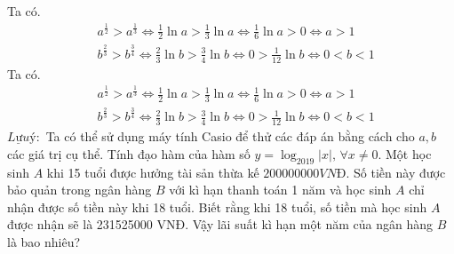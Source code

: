 \documentclass{article}
\begin{document}
Ta có.
$$
\begin{aligned}
& a^{\frac{1}{2}}>a^{\frac{1}{3}} \Leftrightarrow \frac{1}{2} \ln a>\frac{1}{3} \ln a \Leftrightarrow \frac{1}{6} \ln a>0 \Leftrightarrow a>1 \\
& b^{\frac{2}{3}}>b^{\frac{3}{4}} \Leftrightarrow \frac{2}{3} \ln b>\frac{3}{4} \ln b \Leftrightarrow 0>\frac{1}{12} \ln b \Leftrightarrow 0<b<1
\end{aligned}
$$
Ta có.
$$
\begin{aligned}
& a^{\frac{1}{2}}>a^{\frac{1}{3}} \Leftrightarrow \frac{1}{2} \ln a>\frac{1}{3} \ln a \Leftrightarrow \frac{1}{6} \ln a>0 \Leftrightarrow a>1 \\
& b^{\frac{2}{3}}>b^{\frac{3}{4}} \Leftrightarrow \frac{2}{3} \ln b>\frac{3}{4} \ln b \Leftrightarrow 0>\frac{1}{12} \ln b \Leftrightarrow 0<b<1
\end{aligned}
$$
\(\underline{L ư u} ý:\) Ta có thể sử dụng máy tính Casio để thử các đáp án bằng cách cho \(a, b\) các giá trị cụ thể.
Tính đạo hàm của hàm số \(y = {\log _{2019}}\left| x \right|,\,\forall x \ne 0\).
Một học sinh \(A\) khi 15 tuổi được hưởng tài sản thừa kế \(200000000 VNĐ \). Số tiền này được bảo quản trong ngân hàng \(B\) với kì hạn thanh toán 1 năm và học sinh \(A\) chỉ nhận được số tiền này khi 18 tuổi. Biết rằng khi 18 tuổi, số tiền mà học sinh \(A\) được nhận sẽ là 231525000 VNĐ. Vậy lãi suất kì hạn một năm của ngân hàng \(B\) là bao nhiêu?
\end{document}
